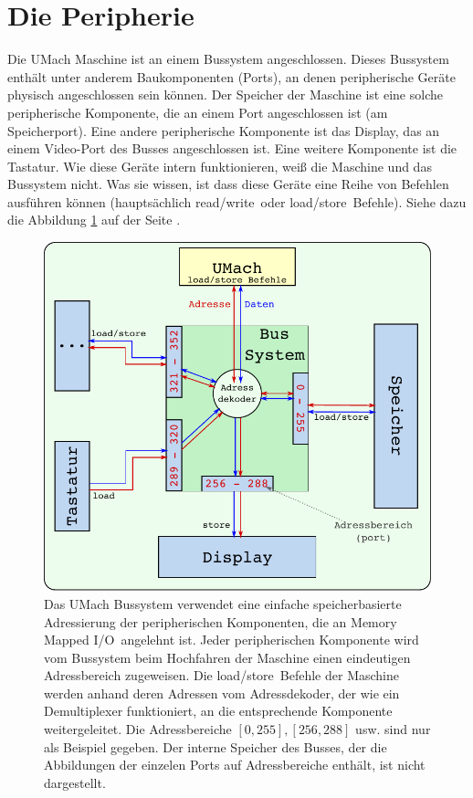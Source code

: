 \section{Die Peripherie}
\label{sec:Peripherie}
Die UMach Maschine ist an einem \gls{Bussystem} angeschlossen.
Dieses Bussystem enthält unter anderem Baukomponenten (Ports), an denen
peripherische Geräte physisch angeschlossen sein können. Der
\gls{Speicher} der Maschine ist eine solche peripherische
Komponente, die an einem Port angeschlossen ist (am
Speicherport). Eine andere peripherische Komponente ist das
Display, das an einem Video-Port des Busses angeschlossen ist. Eine weitere
Komponente ist die Tastatur. Wie diese Geräte intern funktionieren, weiß die
Maschine und das Bussystem nicht. Was sie \glqq wissen\grqq, ist dass diese
Geräte eine Reihe von Befehlen ausführen können (hauptsächlich \glqq
read/write\grqq\ oder \glqq load/store\grqq\ Befehle). Siehe dazu die Abbildung
\ref{fig:UMach-Bussystem} auf der Seite \pageref{fig:UMach-Bussystem}.

\begin{figure}
  \centering
  \includegraphics{img/UMach-Bus}
  \caption[Das UMach Bussystem]
          {Das UMach Bussystem verwendet eine einfache speicherbasierte
          Adressierung der peripherischen Komponenten, die an
          \glqq Memory Mapped I/O\grqq\ angelehnt ist. Jeder peripherischen
          Komponente wird vom Bussystem beim Hochfahren der Maschine einen
          eindeutigen Adressbereich zugeweisen.
          Die \glqq load/store\grqq\ Befehle der Maschine werden anhand deren
          Adressen vom Adressdekoder, der wie ein Demultiplexer funktioniert,
          an die entsprechende Komponente weitergeleitet. Die
          Adressbereiche $[0,255], [256,288]$ usw. sind nur als
          Beispiel gegeben. Der interne Speicher des Busses, der die
          Abbildungen der einzelen Ports auf Adressbereiche enthält, ist nicht
          dargestellt.}
  \label{fig:UMach-Bussystem}
\end{figure}



